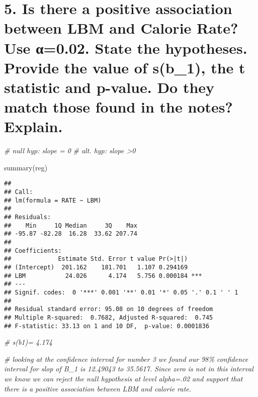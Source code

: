 \documentclass[
]{article}
\newenvironment{Shaded}{\begin{snugshade}}{\end{snugshade}}
\newcommand{\CommentTok}[1]{\textcolor[rgb]{0.56,0.35,0.01}{\textit{#1}}}
\newcommand{\FunctionTok}[1]{\textcolor[rgb]{0.00,0.00,0.00}{#1}}
\newcommand{\NormalTok}[1]{#1}
\begin{document}
\hypertarget{is-there-a-positive-association-between-lbm-and-calorie-rate-use-ux3b10.02.-state-the-hypotheses.-provide-the-value-of-sb_1-the-t-statistic-and-p-value.-do-they-match-those-found-in-the-notes-explain.}{%
\section{5. Is there a positive association between LBM and Calorie
Rate? Use α=0.02. State the hypotheses. Provide the value of s(b\_1),
the t statistic and p-value. Do they match those found in the notes?
Explain.}\label{is-there-a-positive-association-between-lbm-and-calorie-rate-use-ux3b10.02.-state-the-hypotheses.-provide-the-value-of-sb_1-the-t-statistic-and-p-value.-do-they-match-those-found-in-the-notes-explain.}}

\begin{Shaded}
\begin{Highlighting}[]
\CommentTok{\# null hyp:  slope = 0}
\CommentTok{\# alt. hyp:  slope \textgreater{}0}

\FunctionTok{summary}\NormalTok{(reg)}
\end{Highlighting}
\end{Shaded}

\begin{verbatim}
## 
## Call:
## lm(formula = RATE ~ LBM)
## 
## Residuals:
##    Min     1Q Median     3Q    Max 
## -95.87 -82.28  16.28  33.62 207.74 
## 
## Coefficients:
##             Estimate Std. Error t value Pr(>|t|)    
## (Intercept)  201.162    181.701   1.107 0.294169    
## LBM           24.026      4.174   5.756 0.000184 ***
## ---
## Signif. codes:  0 '***' 0.001 '**' 0.01 '*' 0.05 '.' 0.1 ' ' 1
## 
## Residual standard error: 95.08 on 10 degrees of freedom
## Multiple R-squared:  0.7682, Adjusted R-squared:  0.745 
## F-statistic: 33.13 on 1 and 10 DF,  p-value: 0.0001836
\end{verbatim}

\begin{Shaded}
\begin{Highlighting}[]
\CommentTok{\# s(b1)= 4.174}

\CommentTok{\# looking at the confidence interval for number 3 we found our 98\% confidence interval for slop of B\_1 is 12.49043 to 35.5617. Since zero is not in this interval we know we can reject the null hypothesis at level alpha=.02 and support that there is a positive association between LBM and calorie rate.}
\end{Highlighting}
\end{Shaded}
\end{document}
